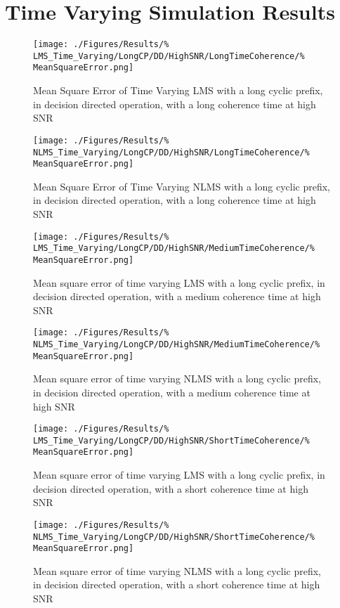 \section{Time Varying Simulation Results}
\label{sec:TVResults}
\begin{figure}[ht]
	\centering
	\begin{minipage}{0.49\textwidth}
		\centering
		\texttt{[image: ./Figures/Results/\%
	LMS\_Time\_Varying/LongCP/DD/HighSNR/LongTimeCoherence/\%
	MeanSquareError.png]}
		\caption{Mean Square Error of Time Varying LMS with 
		a long cyclic prefix, in decision directed operation,
		with a long coherence time at high SNR}
	\end{minipage}
	\begin{minipage}{0.49\textwidth}
		\centering
		\texttt{[image: ./Figures/Results/\%
	NLMS\_Time\_Varying/LongCP/DD/HighSNR/LongTimeCoherence/\%
	MeanSquareError.png]}
		\caption{Mean Square Error of Time Varying NLMS with 
		a long cyclic prefix, in decision directed operation,
		with a long coherence time at high SNR}
	\end{minipage}
\end{figure}
\begin{figure}[ht]
	\centering
	\begin{minipage}{0.49\textwidth}
		\centering
		\texttt{[image: ./Figures/Results/\%
	LMS\_Time\_Varying/LongCP/DD/HighSNR/MediumTimeCoherence/\%
	MeanSquareError.png]}
		\caption{Mean square error of time varying LMS with a 
		long cyclic prefix, in decision directed operation, 
		with a medium coherence time at high SNR}
		\label{fig:Medium-High-Directed-Long}
	\end{minipage}
	\begin{minipage}{0.49\textwidth}
		\centering
		\texttt{[image: ./Figures/Results/\%
	NLMS\_Time\_Varying/LongCP/DD/HighSNR/MediumTimeCoherence/\%
	MeanSquareError.png]}
		\caption{Mean square error of time varying NLMS with 
		a long cyclic prefix, in decision directed operation, 
		with a medium coherence time at high SNR}
	\end{minipage}
\end{figure}

\begin{figure}[ht]
	\centering
	\begin{minipage}{0.49\textwidth}
		\centering
		\texttt{[image: ./Figures/Results/\%
	LMS\_Time\_Varying/LongCP/DD/HighSNR/ShortTimeCoherence/\%
	MeanSquareError.png]}
		\caption{Mean square error of time varying LMS with a 
		long cyclic prefix, in decision directed operation,
		with a short coherence time at high SNR}
	\end{minipage}
	\begin{minipage}{0.49\textwidth}
		\centering
		\texttt{[image: ./Figures/Results/\%
	NLMS\_Time\_Varying/LongCP/DD/HighSNR/ShortTimeCoherence/\%
	MeanSquareError.png]}
		\caption{Mean square error of time varying NLMS with 
		a long cyclic prefix, in decision directed operation,
		with a short coherence time at high SNR}
		\label{fig:NLMS-Short-High-Directed-Long}
	\end{minipage}
\end{figure}

